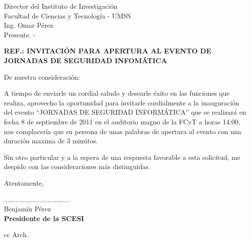\documentclass[letterpaper,12pt]{letter}
\begin{document}
\date {6 de septiembre de 2011}

\begin{letter}{Director del Instituto de Investigaci\'on \\  Facultad de Ciencias y Tecnolog\'ia - UMSS \\ Ing. Omar P\'erez \\
Presente. -}

\begin{center}
	\opening{\textbf{REF.: INVITACI\'ON PARA APERTURA AL EVENTO DE JORNADAS DE SEGURIDAD INFOM\'ATICA}}
\end{center}

De nuestra consideración:

A tiempo de enviarle un cordial saludo y desearle éxito en las funciones que realiza, aprovecho la oportunidad para invitarle 
cordialmente a la inauguraci\'on del evento ``JORNADAS DE SEGURIDAD INFORMÁTICA'' que se realizar\'a en fecha 8 de septiembre 
de 2011 en el auditorio magno de la FCyT a horas 14:00, nos complacer\'ia que su persona de unas palabras de apertura al evento 
con una duraci\'on maxima de 3 min\'utos.
             
Sin otro particular y a la espera de una respuesta favorable a esta solicitud, me despido con las consideraciones más distinguidas.

Atentamente,

\vspace{5cm}

\begin{center}
...................................\\
Benjam\'in P\'erez\\
{\bfseries Presidente de la  SCESI}
\end{center}
\vspace{2cm}
cc Arch.
\end{letter}
\end{document}
